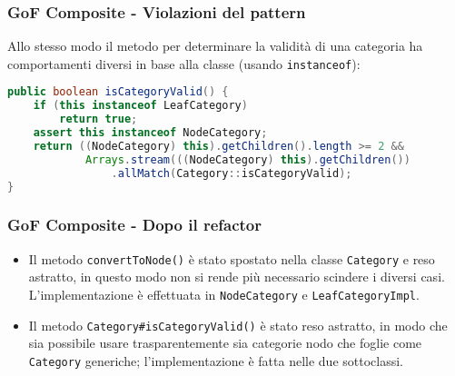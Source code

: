 \begin{frame}[fragile]
    \frametitle{GoF Composite - Violazioni del pattern}

    Allo stesso modo il metodo per determinare la validità di una categoria ha comportamenti diversi in base alla classe (usando \texttt{instanceof}):

    \lstset{style=java}
    \begin{lstlisting}[language=java, caption={Controller\#appendCategory() v5 commit 34c1a67}]
public boolean isCategoryValid() {
    if (this instanceof LeafCategory)
        return true;
    assert this instanceof NodeCategory;
    return ((NodeCategory) this).getChildren().length >= 2 &&
            Arrays.stream(((NodeCategory) this).getChildren())
                .allMatch(Category::isCategoryValid);
}
    \end{lstlisting}

\end{frame}


\begin{frame}
    \frametitle{GoF Composite - Dopo il refactor}

    \begin{minipage}{.43\textwidth}
        \begin{figure}
            \centering
        \end{figure}
    \end{minipage}
    \begin{minipage}{.55\textwidth}
        \begin{itemize}
            \item<1-> Il metodo \texttt{convertToNode()} è stato spostato nella classe \texttt{Category} e reso astratto, in questo modo non si rende più necessario scindere i diversi casi. L'implementazione è effettuata in \texttt{NodeCategory} e \texttt{LeafCategoryImpl}.
            \item<2-> Il metodo \texttt{Category\#isCategoryValid()} è stato reso astratto, in modo che sia possibile usare trasparentemente sia categorie nodo che foglie come \texttt{Category} generiche; l'implementazione è fatta nelle due sottoclassi.
        \end{itemize}
    \end{minipage}

\end{frame}


